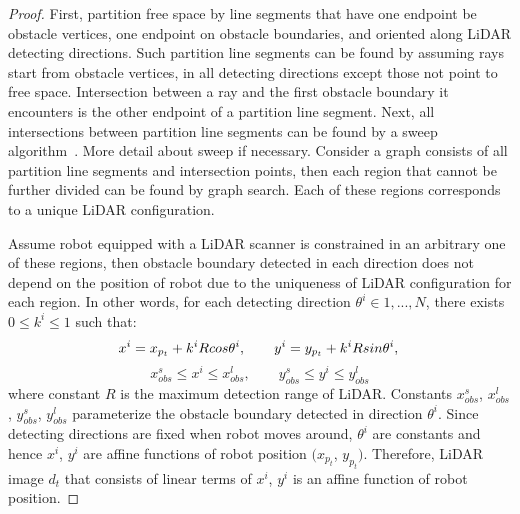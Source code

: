 \begin{proof}
    First, partition free space by line segments that have one endpoint be obstacle vertices, one endpoint on obstacle boundaries, 
    and oriented along LiDAR detecting directions.
    Such partition line segments can be found by assuming rays start from obstacle vertices,
    in all detecting directions except those not point to free space.
    Intersection between a ray and the first obstacle boundary it encounters is the other endpoint of a partition line segment.
    Next, all intersections between partition line segments can be found by a sweep algorithm~\cite{CGbook}. 
    {\color{blue} More detail about sweep if necessary.}
    Consider a graph consists of all partition line segments and intersection points,
    then each region that cannot be further divided can be found by graph search.
    Each of these regions corresponds to a unique LiDAR configuration.
    
    Assume robot equipped with a LiDAR scanner is constrained in an arbitrary one of these regions, 
    then obstacle boundary detected in each direction does not depend on the position of robot 
    due to the uniqueness of LiDAR configuration for each region.
    In other words, for each detecting direction $\theta^i \in {1, ..., N}$, there exists $0 \le k^i \le 1$ such that:
    \begin{equation}
        \label{eq: intersection1}
        x^i = x_{p_t} + k^i R cos\theta^i, \qquad y^i = y_{p_t} + k^i R sin\theta^i, \\
    \end{equation} 
    \begin{equation}
        \label{eq: intersection2}
        x_{obs}^s \le x^i \le x_{obs}^l, \qquad y_{obs}^s \le y^i \le y_{obs}^l
    \end{equation} 
    where constant $R$ is the maximum detection range of LiDAR.
    Constants $x_{obs}^s$, $x_{obs}^l$, $y_{obs}^s$, $y_{obs}^l$ parameterize the obstacle boundary detected in direction $\theta^i$.
    Since detecting directions are fixed when robot moves around,  
    $\theta^i$ are constants and hence $x^i$, $y^i$ are affine functions of robot position $(x_{p_t}$, $y_{p_t})$.
    Therefore, LiDAR image $d_t$ that consists of linear terms of $x^i$, $y^i$ is an affine function of robot position.
\end{proof}

